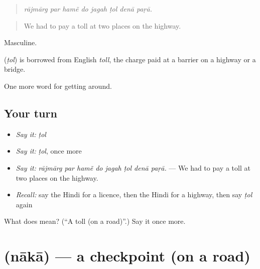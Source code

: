 \begin{quote}
       
\end{quote}

\begin{quote}
\emph{rājmārg par hamẽ do jagah ṭol denā paṛā.}
\end{quote}

\begin{quote}
We had to pay a toll at two places on the highway.
\end{quote}

Masculine.

\begin{cousinweb}
\textbf{} (\emph{ṭol}) is borrowed from English \emph{toll}, the charge paid at a barrier on a highway or a bridge.
\end{cousinweb}

\begin{grammarlens}[title={What you've built}]
One more word for getting around.
\end{grammarlens}

\subsection*{Your turn}
\begin{itemize}
\raggedright
  \item \emph{Say it:} \emph{ṭol}
  \item \emph{Say it:} \emph{ṭol}, once more
  \item \emph{Say it:} \emph{rājmārg par hamẽ do jagah ṭol denā paṛā.} — We had to pay a toll at two places on the highway.
  \item \emph{Recall:} say the Hindi for a licence, then the Hindi for a highway, then say \emph{ṭol} again
\end{itemize}

\begin{tcolorbox}[breakable,colback=teal!4,colframe=teal!35!black,title={Before you move on}]
What does  mean? (\textquotedblleft{}A toll (on a road)\textquotedblright{}.) Say it once more.
\end{tcolorbox}
\section[\texorpdfstring{\hi{नाका} (nākā)}{नाका (nākā)}]{ (nākā) — a checkpoint (on a road)}

\label{lesson:HI-C407-naka}



